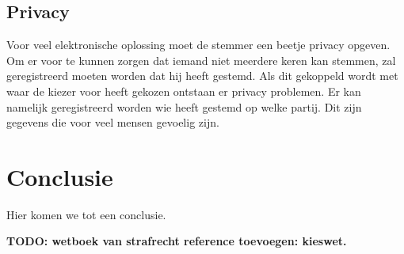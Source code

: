 \documentclass[a4paper]{article}
\newcommand{\TODO}[1]{{\color{red}\textbf{TODO: #1}}}
\begin{document}
\subsection{Privacy}
Voor veel elektronische oplossing moet de stemmer een beetje privacy opgeven.
Om er voor te kunnen zorgen dat iemand niet meerdere keren kan stemmen, zal geregistreerd moeten worden dat hij heeft gestemd. 
Als dit gekoppeld wordt met waar de kiezer voor heeft gekozen ontstaan er privacy problemen.
Er kan namelijk geregistreerd worden wie heeft gestemd op welke partij. 
Dit zijn gegevens die voor veel mensen gevoelig zijn.


\newpage

\section{Conclusie}

Hier komen we tot een conclusie.

\TODO{wetboek van strafrecht reference toevoegen: kieswet.}


\renewcommand\refname{Literatuur}

\end{document}
